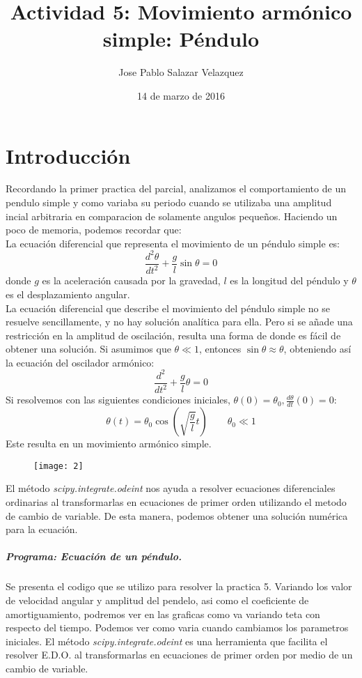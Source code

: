 \documentclass[12pt]{article}
\title{Actividad 5: Movimiento armónico simple: Péndulo}
\author{Jose Pablo Salazar Velazquez}
\date{14 de marzo de 2016}
\begin{document}
\maketitle
\section{Introducción}
Recordando la primer practica del parcial, analizamos el comportamiento de un pendulo simple y como variaba su periodo cuando se utilizaba una amplitud incial arbitraria en comparacion de solamente angulos pequeños. Haciendo un poco de memoria, podemos recordar que: \\
La ecuación diferencial que representa el movimiento de un péndulo simple es:
\begin{equation}
\label{1}
\frac{d^2\theta}{dt^2} + \frac{g}{l}\sin\theta=0
\end{equation}
donde $g$ es la aceleración causada por la gravedad, $l$ es la longitud del péndulo y $\theta$ es el desplazamiento angular. \\
La ecuación diferencial que describe el movimiento del péndulo simple no se resuelve sencillamente, y no hay solución analítica para ella. Pero si se añade una restricción en la amplitud de oscilación, resulta una forma de donde es fácil de obtener una solución. Si asumimos que $\theta \ll 1$, entonces $\sin\theta\approx\theta$, obteniendo así la ecuación del oscilador armónico:
\begin{equation}
\frac{d^2}{dt^2}+\frac{g}{l}\theta=0
\end{equation}
Si resolvemos con las siguientes condiciones iniciales, $\theta(0)=\theta_0, \frac{d\theta}{dt}(0)=0$:
\begin{equation}
\theta(t)=\theta_0\cos\left(\sqrt{\frac{g}{l}}t\right) \qquad \theta_0\ll1
\end{equation}
Este resulta en un movimiento armónico simple. \\

\begin{figure}[H]
\centering
\texttt{[image: 2]}
\end{figure}

El método \textit{scipy.integrate.odeint} nos ayuda a resolver ecuaciones diferenciales ordinarias al transformarlas en ecuaciones de primer orden utilizando el metodo de cambio de variable. De esta manera, podemos obtener una solución numérica para la ecuación. 

\subparagraph*{Programa: Ecuación de un péndulo.}
Se presenta el codigo que se utilizo para resolver la practica 5. Variando los valor de velocidad angular y amplitud del pendelo, asi como el coeficiente de amortiguamiento, podremos ver en las graficas como va variando teta con respecto del tiempo. Podemos ver como varia cuando cambiamos los parametros iniciales.
El método \textit{scipy.integrate.odeint} es una herramienta que facilita el resolver E.D.O. al transformarlas en ecuaciones de primer orden por medio de un cambio de variable.
\end{document}
